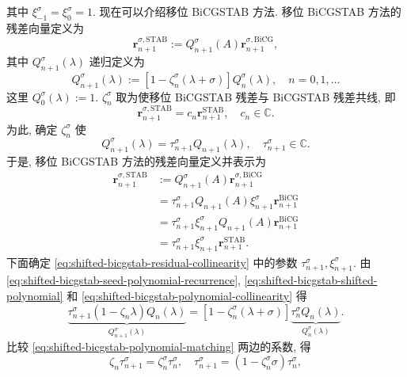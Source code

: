 {其中 $\xi_{-1}^{\sigma}=\xi_0^{\sigma}=1$.}
{现在可以介绍移位 BiCGSTAB 方法. 移位 BiCGSTAB 方法的残差向量定义为}
\[\bm r_{n+1}^{\sigma,\mathrm{STAB}}:=Q_{n+1}^{\sigma}(A)\bm r_{n+1}^{\sigma,\mathrm{BiCG}},\]
{其中 $Q_{n+1}^{\sigma}(\lambda)$ 递归定义为}
\begin{equation}\label{eq:shifted-bicgstab-shifted-polynomial}Q_{n+1}^{\sigma}(\lambda):=[1-\zeta_n^{\sigma}(\lambda+\sigma)]Q_n^{\sigma}(\lambda),\quad n=0,1,\ldots\end{equation}
{这里 $Q_0^{\sigma}(\lambda):=1$. $\zeta_n^{\sigma}$ 取为使移位 BiCGSTAB 残差与 BiCGSTAB 残差共线, 即}
\[\bm r_{n+1}^{\sigma,\mathrm{STAB}}=c_n\bm r_{n+1}^{\mathrm{STAB}},\quad c_n\in\mathbb C.\]
{为此, 确定 $\zeta_n^{\sigma}$ 使}
\begin{equation}\label{eq:shifted-bicgstab-polynomial-collinearity}Q_{n+1}^{\sigma}(\lambda)=\tau_{n+1}^{\sigma}Q_{n+1}(\lambda),\quad\tau_{n+1}^{\sigma}\in\mathbb C.\end{equation}
{于是, 移位 BiCGSTAB 方法的残差向量定义并表示为}
\begin{equation}\label{eq:shifted-bicgstab-residual-collinearity}\begin{aligned}\bm r_{n+1}^{\sigma,\mathrm{STAB}}&:=Q_{n+1}^{\sigma}(A)\bm r_{n+1}^{\sigma,\mathrm{BiCG}}\\&=\tau_{n+1}^{\sigma}Q_{n+1}(A)\xi_{n+1}^{\sigma}\bm r_{n+1}^{\mathrm{BiCG}}\\&=\tau_{n+1}^{\sigma}\xi_{n+1}^{\sigma}Q_{n+1}(A)\bm r_{n+1}^{\mathrm{BiCG}}\\&=\tau_{n+1}^{\sigma}\xi_{n+1}^{\sigma}\bm r_{n+1}^{\mathrm{STAB}}.\end{aligned}\end{equation}
{下面确定 \eqref{eq:shifted-bicgstab-residual-collinearity} 中的参数 $\tau_{n+1}^{\sigma},\xi_{n+1}^{\sigma}$. 由 \eqref{eq:shifted-bicgstab-seed-polynomial-recurrence}, \eqref{eq:shifted-bicgstab-shifted-polynomial} 和 \eqref{eq:shifted-bicgstab-polynomial-collinearity} 得}
\begin{equation}\label{eq:shifted-bicgstab-polynomial-matching}\underbrace{\tau_{n+1}^{\sigma}(1-\zeta_n\lambda)Q_n(\lambda)}_{Q_{n+1}^{\sigma}(\lambda)}=[1-\zeta_n^{\sigma}(\lambda+\sigma)]\underbrace{\tau_n^{\sigma}Q_n(\lambda)}_{Q_n^{\sigma}(\lambda)}.\end{equation}
{比较 \eqref{eq:shifted-bicgstab-polynomial-matching} 两边的系数, 得}
\[\zeta_n\tau_{n+1}^{\sigma}=\zeta_n^{\sigma}\tau_n^{\sigma},\quad\tau_{n+1}^{\sigma}=(1-\zeta_n^{\sigma}\sigma)\tau_n^{\sigma},\]
